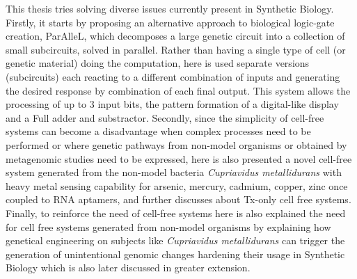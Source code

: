 This thesis tries solving diverse issues currently present in Synthetic Biology. Firstly, it starts by proposing an alternative approach to biological logic-gate creation, ParAlleL, which decomposes a large genetic circuit into a collection of small subcircuits, solved in parallel. Rather than having a single type of cell (or genetic material) doing the computation, here is used separate versions (subcircuits) each reacting to a different combination of inputs and generating the desired response by combination of each final output. This system allows the processing of up to 3 input bits, the pattern formation of a digital-like display and a Full adder and substractor.
Secondly, since the simplicity of cell-free systems can become a disadvantage when complex processes need to be performed or where genetic pathways from non-model organisms or obtained by metagenomic studies need to be expressed, here is also presented a novel cell-free system generated from the non-model bacteria \textit{Cupriavidus metallidurans} with heavy metal sensing capability for arsenic, mercury, cadmium, copper, zinc once coupled to RNA aptamers, and further discusses about Tx-only cell free systems. 
Finally, to reinforce the need of cell-free systems here is also explained the need for cell free systems generated from non-model  organisms by explaining how genetical engineering on subjects like \textit{Cupriavidus metallidurans} can trigger the generation of unintentional genomic changes hardening their usage in Synthetic Biology which is also later discussed in greater extension.